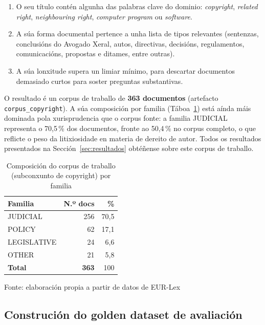 \documentclass[11pt, a4paper, oneside]{report}
\newcommand{\fonte}[1]{%
  \par\smallskip
  {\centering\fontsize{9}{11}\selectfont Fonte: #1\par}}
\begin{document}
\begin{enumerate}
  \item O seu título contén algunha das palabras clave do dominio: \textit{copyright},
    \textit{related right}, \textit{neighbouring right}, \textit{computer program} ou
    \textit{software}.
  \item A súa forma documental pertence a unha lista de tipos relevantes (sentenzas,
    conclusións do Avogado Xeral, autos, directivas, decisións, regulamentos,
    comunicacións, propostas e ditames, entre outras).
  \item A súa lonxitude supera un limiar mínimo, para descartar documentos demasiado
    curtos para soster preguntas substantivas.
\end{enumerate}

O resultado é un corpus de traballo de \textbf{363 documentos} (artefacto
\texttt{corpus\_copyright}). A súa composición por familia (Táboa~\ref{tab:corpus_traballo})
está aínda máis dominada pola xurisprudencia que o corpus fonte: a familia JUDICIAL
representa o 70,5\,\% dos documentos, fronte ao 50,4\,\% no corpus completo, o que reflicte
o peso da litixiosidade en materia de dereito de autor. Todos os resultados presentados na
Sección~\ref{sec:resultados} obtéñense sobre este corpus de traballo.

\begin{table}[H]
  \centering
  \caption{Composición do corpus de traballo (subconxunto de copyright) por familia}
  \label{tab:corpus_traballo}
  \begin{tabular}{lrr}
    \toprule
    \textbf{Familia} & \textbf{N.º docs} & \textbf{\%} \\
    \midrule
    JUDICIAL    & 256 & 70,5 \\
    POLICY      &  62 & 17,1 \\
    LEGISLATIVE &  24 &  6,6 \\
    OTHER       &  21 &  5,8 \\
    \midrule
    \textbf{Total} & \textbf{363} & 100 \\
    \bottomrule
  \end{tabular}
  \fonte{elaboración propia a partir de datos de EUR-Lex}
\end{table}

\subsection{Construción do golden dataset de avaliación}
\label{sec:golden_dataset}
\end{document}
